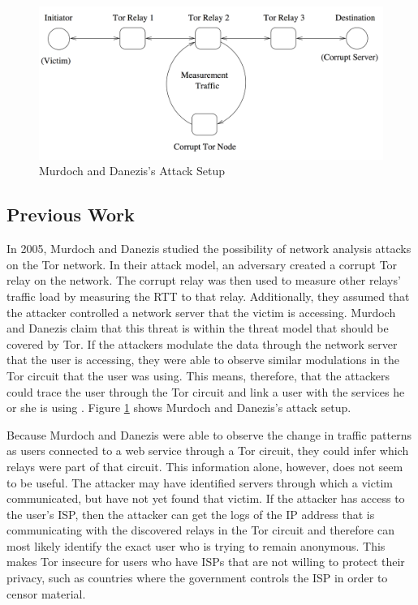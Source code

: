 \documentclass[12pt,journal]{IEEEtran}
\begin{document}
\begin{figure}

 \center
  \includegraphics[width=\textwidth]{figures/murdochattacksetup.png}
  \caption{Murdoch and Danezis's Attack Setup \cite{Murdoch:2005:LTA:1058433.1059390}}
  \label{murdochsetup}
\end{figure}

\subsection{Previous Work}
In 2005, Murdoch and Danezis studied the possibility of network analysis attacks on the Tor network. In their attack model, an adversary created a corrupt Tor relay on the network. The corrupt relay was then used to measure other relays' traffic load by measuring the RTT to that relay. Additionally, they assumed that the attacker controlled a network server that the victim is accessing. Murdoch and Danezis claim that this threat is within the threat model that should be covered by Tor. If the attackers modulate the data through the network server that the user is accessing, they were able to observe similar modulations in the Tor circuit that the user was using. This means, therefore, that the attackers could trace the user through the Tor circuit and link a user with the services he or she is using \cite{Murdoch:2005:LTA:1058433.1059390}. Figure \ref{murdochsetup} shows Murdoch and Danezis's attack setup.
\par
Because Murdoch and Danezis were able to observe the change in traffic patterns as users connected to a web service through a Tor circuit, they could infer which relays were part of that circuit. This information alone, however, does not seem to be useful. The attacker may have identified servers through which a victim communicated, but have not yet found that victim. If the attacker has access to the user's ISP, then the attacker can get the logs of the IP address that is communicating with the discovered relays in the Tor circuit and therefore can most likely identify the exact user who is trying to remain anonymous. This makes Tor insecure for users who have ISPs that are not willing to protect their privacy, such as countries where the government controls the ISP in order to censor material.
\end{document}
